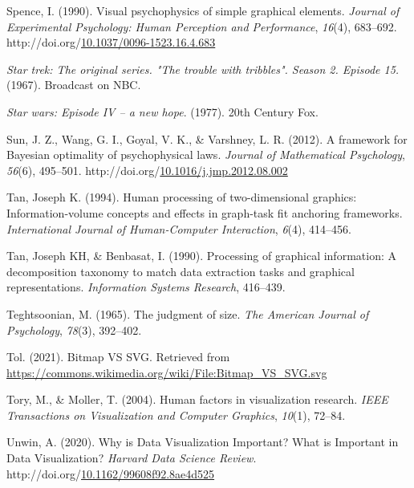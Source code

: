 \documentclass[print]{nuthesis}
\newlength{\cslhangindent}
\newenvironment{CSLReferences}[2]%
{\setlength{\parindent}{0pt}%
\everypar{\setlength{\hangindent}{\cslhangindent}}\ignorespaces}%
{\par}
\begin{document}
\begin{CSLReferences}{1}{0}
\leavevmode{}%
Spence, I. (1990). Visual psychophysics of simple graphical elements. \emph{Journal of Experimental Psychology: Human Perception and Performance}, \emph{16}(4), 683--692. http://doi.org/\href{https://doi.org/10.1037/0096-1523.16.4.683}{10.1037/0096-1523.16.4.683}

\leavevmode{}%
\emph{Star trek: The original series. "The trouble with tribbles". Season 2. Episode 15.} (1967). Broadcast on NBC.

\leavevmode{}%
\emph{Star wars: Episode IV -- a new hope}. (1977). 20th Century Fox.

\leavevmode{}%
Sun, J. Z., Wang, G. I., Goyal, V. K., \& Varshney, L. R. (2012). A framework for {Bayesian} optimality of psychophysical laws. \emph{Journal of Mathematical Psychology}, \emph{56}(6), 495--501. http://doi.org/\href{https://doi.org/10.1016/j.jmp.2012.08.002}{10.1016/j.jmp.2012.08.002}

\leavevmode{}%
Tan, Joseph K. (1994). Human processing of two-dimensional graphics: Information-volume concepts and effects in graph-task fit anchoring frameworks. \emph{International Journal of Human-Computer Interaction}, \emph{6}(4), 414--456.

\leavevmode{}%
Tan, Joseph KH, \& Benbasat, I. (1990). Processing of graphical information: A decomposition taxonomy to match data extraction tasks and graphical representations. \emph{Information Systems Research}, 416--439.

\leavevmode{}%
Teghtsoonian, M. (1965). The judgment of size. \emph{The American Journal of Psychology}, \emph{78}(3), 392--402.

\leavevmode{}%
Tol. (2021). Bitmap VS SVG. Retrieved from \url{https://commons.wikimedia.org/wiki/File:Bitmap_VS_SVG.svg}

\leavevmode{}%
Tory, M., \& Moller, T. (2004). Human factors in visualization research. \emph{IEEE Transactions on Visualization and Computer Graphics}, \emph{10}(1), 72--84.

\leavevmode{}%
Unwin, A. (2020). Why is {Data} {Visualization} {Important}? {What} is {Important} in {Data} {Visualization}? \emph{Harvard Data Science Review}. http://doi.org/\href{https://doi.org/10.1162/99608f92.8ae4d525}{10.1162/99608f92.8ae4d525}


\end{CSLReferences}
\end{document}
